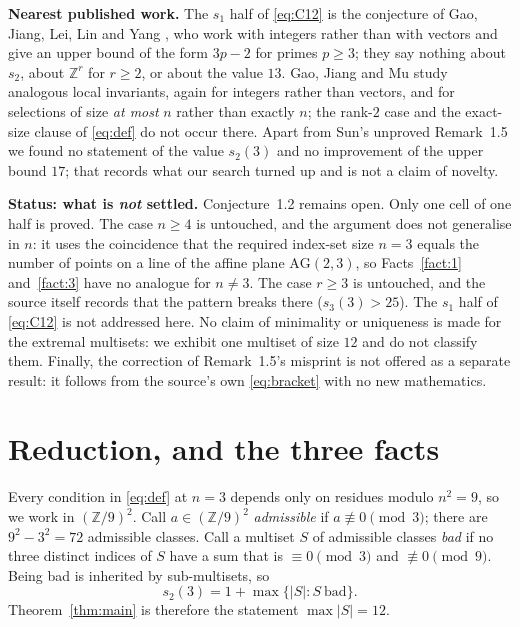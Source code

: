 \documentclass[11pt]{amsart}
\newcommand{\ZZ}{\mathbb Z}
\begin{document}
\smallskip
\noindent\textbf{Nearest published work.} The $s_1$ half of \eqref{eq:C12} is
the conjecture of Gao, Jiang, Lei, Lin and Yang \cite{GJLLY}, who work with
integers rather than with vectors and give an upper bound of the form $3p-2$ for
primes $p\ge3$; they say nothing about $s_2$, about $\ZZ^r$ for $r\ge2$, or about
the value $13$. Gao, Jiang and Mu \cite{GJM} study analogous local invariants,
again for integers rather than vectors, and for selections of size \emph{at
most} $n$ rather than exactly $n$; the rank-$2$ case and the exact-size clause of
\eqref{eq:def} do not occur there. Apart from Sun's unproved Remark~1.5 we found
no statement of the value $s_2(3)$ and no improvement of the upper bound $17$;
that records what our search turned up and is not a claim of novelty.

\smallskip
\noindent\textbf{Status: what is \emph{not} settled.}
Conjecture~1.2 remains open. Only one cell of one half is proved. The case
$n\ge4$ is untouched, and the argument does not generalise in $n$: it uses the
coincidence that the required index-set size $n=3$ equals the number of points
on a line of the affine plane $\mathrm{AG}(2,3)$, so Facts~\ref{fact:1}
and~\ref{fact:3} have no analogue for $n\ne3$. The case $r\ge3$ is untouched,
and the source itself records that the pattern breaks there ($s_3(3)>25$). The
$s_1$ half of \eqref{eq:C12} is not addressed here. No claim of minimality or
uniqueness is made for the extremal multisets: we exhibit one multiset of size
$12$ and do not classify them. Finally, the correction of Remark~1.5's misprint is
not offered as a separate result: it follows from the source's own
\eqref{eq:bracket} with no new mathematics.

\section{Reduction, and the three facts}\label{sec:facts}

Every condition in \eqref{eq:def} at $n=3$ depends only on residues modulo
$n^2=9$, so we work in $(\ZZ/9)^2$. Call $a\in(\ZZ/9)^2$ \emph{admissible} if
$a\not\equiv0\pmod3$; there are $9^2-3^2=72$ admissible classes. Call a
multiset $S$ of admissible classes \emph{bad} if no three distinct indices of
$S$ have a sum that is $\equiv0\pmod3$ and $\not\equiv0\pmod9$. Being bad is
inherited by sub-multisets, so
\begin{equation}\label{eq:sbad}
  s_2(3)=1+\max\{|S|:S\ \text{bad}\}.
\end{equation}
Theorem~\ref{thm:main} is therefore the statement $\max|S|=12$.
\end{document}
